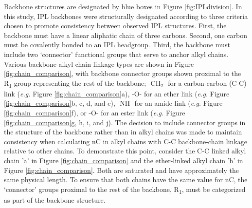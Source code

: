 Backbone structures are designated by blue boxes in Figure \ref{fig:IPLdivision}. In this study, IPL backbones were structurally designated according to three criteria chosen to promote consistency between observed IPL structures. First, the backbone must have a linear aliphatic chain of three carbons. Second, one carbon must be covalently bonded to an IPL headgroup. Third, the backbone must include two `connector' functional groups that serve to anchor alkyl chains. Various backbone-alkyl chain linkage types are shown in Figure \ref{fig:chain_comparison}, with backbone connector groups shown proximal to the R\textsubscript{1} group representing the rest of the backbone; -CH$_{2}$- for a carbon-carbon (C-C) link (\textit{e.g.} Figure \ref{fig:chain_comparison}a), -O- for an ether link (\textit{e.g.} Figure \ref{fig:chain_comparison}b, c, d, and e), -NH- for an amide link (\textit{e.g.} Figure \ref{fig:chain_comparison}f), or -O- for an ester link (\textit{e.g.} Figure \ref{fig:chain_comparison}g, h, i, and j). The decision to include connector groups in the structure of the backbone rather than in alkyl chains was made to maintain consistency when calculating nC in alkyl chains with C-C backbone-chain linkage relative to other chains. To demonstrate this point, consider the C-C linked alkyl chain 'a' in Figure \ref{fig:chain_comparison} and the ether-linked alkyl chain 'b' in Figure \ref{fig:chain_comparison}. Both are saturated and have approximately the same physical length. To ensure that both chains have the same value for nC, the `connector' groups proximal to the rest of the backbone, R\textsubscript{1}, must be categorized as part of the backbone structure.


